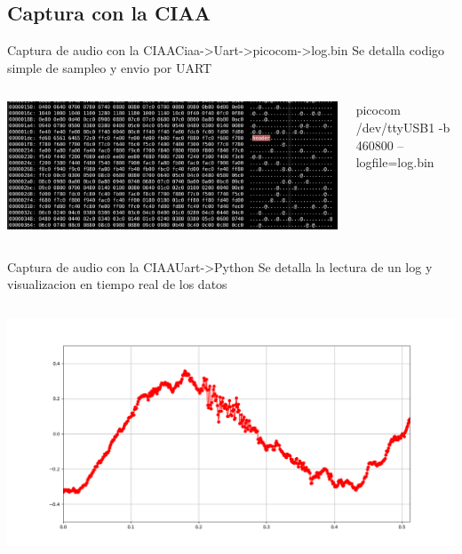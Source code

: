  \subsection{Captura con la CIAA}
 \begin{frame}{Captura de audio con la CIAA}{Ciaa->Uart->picocom->log.bin}
    \handsonicon
      Se detalla codigo simple de sampleo y envio por UART
    \begin{columns}[onlytextwidth]
       
       \includegraphics[width=\textwidth]{1_clase/ciaa/psf1/log.png}
       \begin{block}{\tiny{picocom /dev/ttyUSB1 -b 460800 --logfile=log.bin}}
       \end{block}
    \end{columns}
    \vfill
 \end{frame}
 \begin{frame}{Captura de audio con la CIAA}{Uart->Python}
    \handsonicon
    Se detalla la lectura de un log y visualizacion en tiempo real de los datos
    \begin{columns}[onlytextwidth]
       
       
       \includegraphics[width=\textwidth]{1_clase/ciaa/psf1/visualize.png}
    \end{columns}
    \vfill
 \end{frame}
